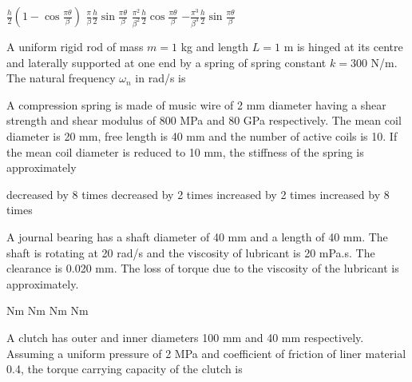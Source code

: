 \documentclass[addpoints,11pt]{exam}
\begin{document}
\begin{questions}
        \begin{oneparchoices}
            \choice $\frac{h}{2}(1-\cos\frac{\pi\theta}{\beta})$
            \choice $\frac{\pi}{\beta}\frac{h}{2}\sin\frac{\pi\theta}{\beta}$
            \choice $\frac{\pi^2}{\beta^2}\frac{h}{2}\cos\frac{\pi\theta}{\beta}$
            \choice $-\frac{\pi^3}{\beta^3}\frac{h}{2}\sin\frac{\pi\theta}{\beta}$
        \end{oneparchoices}

        \question A uniform rigid rod of mass $m=1$ kg and length $L=1$ m is hinged at its centre and laterally supported at one end by a spring of spring constant $k=300$ N/m. The natural frequency $\omega_n$ in rad/s is

        \begin{oneparchoices}
        \end{oneparchoices}

        \question A compression spring is made of music wire of 2 mm diameter having a shear strength and shear modulus of 800 MPa and 80 GPa respectively. The mean coil diameter is 20 mm, free length is 40 mm and the number of active coils is 10. If the mean coil diameter is reduced to 10 mm, the stiffness of the spring is approximately

        \begin{oneparchoices}
            \choice decreased by 8 times
            \choice decreased by 2 times
            \choice increased by 2 times
            \choice increased by 8 times
        \end{oneparchoices}

        \question A journal bearing has a shaft diameter of 40 mm and a length of 40 mm. The shaft is rotating at 20 rad/s and the viscosity of lubricant is 20 mPa.s. The clearance is 0.020 mm. The loss of torque due to the viscosity of the lubricant is approximately.

        \begin{oneparchoices}
             Nm
             Nm
             Nm
             Nm
        \end{oneparchoices}

        \question A clutch has outer and inner diameters 100 mm and 40 mm respectively. Assuming a uniform pressure of 2 MPa and coefficient of friction of liner material 0.4, the torque carrying capacity of the clutch is


\end{questions}
\end{document}
